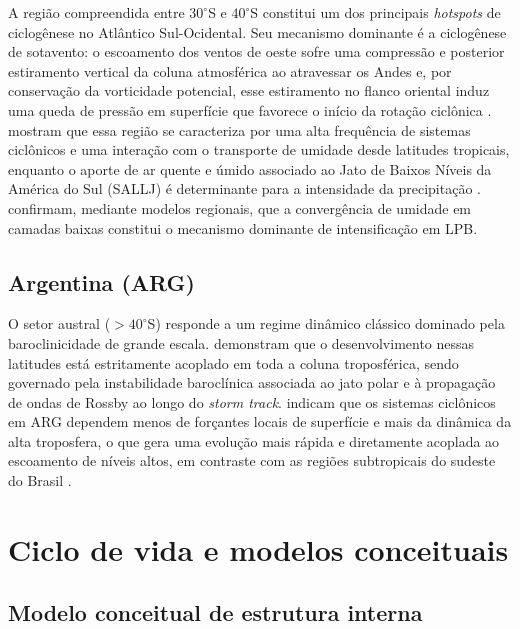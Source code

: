 A região compreendida entre $30^\circ$S e $40^\circ$S constitui um dos principais \textit{hotspots} de ciclogênese no Atlântico Sul-Ocidental.
Seu mecanismo dominante é a ciclogênese de sotavento: o escoamento dos ventos de oeste sofre uma compressão e posterior estiramento vertical da coluna atmosférica ao atravessar os Andes e, por conservação da vorticidade potencial, esse estiramento no flanco oriental induz uma queda de pressão em superfície que favorece o início da rotação ciclônica \citep{gan1994influence}.
\citet{reboita2010south} mostram que essa região se caracteriza por uma alta frequência de sistemas ciclônicos e uma interação com o transporte de umidade desde latitudes tropicais, enquanto o aporte de ar quente e úmido associado ao Jato de Baixos Níveis da América do Sul (SALLJ) é determinante para a intensidade da precipitação \citep{crespo2020potential}.
\citet{gramcianinov2024early} confirmam, mediante modelos regionais, que a convergência de umidade em camadas baixas constitui o mecanismo dominante de intensificação em LPB.

\subsection{Argentina (ARG)}\label{subsec:tb_arg}

O setor austral ($>40^\circ$S) responde a um regime dinâmico clássico dominado pela baroclinicidade de grande escala.
\citet{hoskins2005new} demonstram que o desenvolvimento nessas latitudes está estritamente acoplado em toda a coluna troposférica, sendo governado pela instabilidade baroclínica associada ao jato polar e à propagação de ondas de Rossby ao longo do \textit{storm track}.
\citet{simmonds2000variability} indicam que os sistemas ciclônicos em ARG dependem menos de forçantes locais de superfície e mais da dinâmica da alta troposfera, o que gera uma evolução mais rápida e diretamente acoplada ao escoamento de níveis altos, em contraste com as regiões subtropicais do sudeste do Brasil \citep{vera2002cold}.


\section{Ciclo de vida e modelos conceituais}\label{sec:tb_evolucion}

\subsection{Modelo conceitual de estrutura interna}\label{subsec:tb_modelos}

